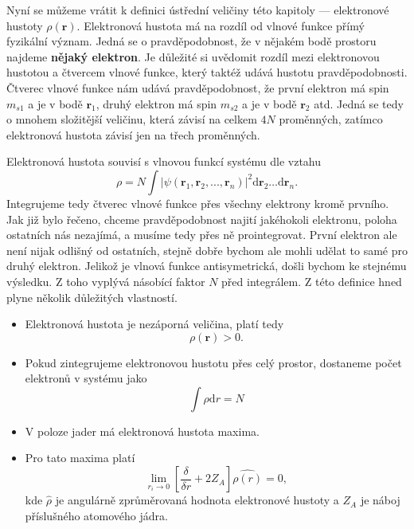 Nyní se můžeme vrátit k definici ústřední veličiny této kapitoly --- elektronové hustoty $\rho(\mathbf{r})$.
Elektronová hustota má na rozdíl od vlnové funkce přímý fyzikální význam. Jedná se o pravděpodobnost, že v nějakém bodě prostoru najdeme \textbf{nějaký elektron}. Je důležité si uvědomit rozdíl mezi elektronovou hustotou a čtvercem vlnové funkce, který taktéž udává hustotu pravděpodobnosti. Čtverec vlnové funkce nám udává pravděpodobnost, že první elektron má spin $m_{s1}$ a je v bodě $\mathbf{r}_1$, druhý elektron má spin $m_{s2}$ a je v bodě $\mathbf{r}_2$ atd. Jedná se tedy o mnohem složitější veličinu, která závisí na celkem $4N$ proměnných, zatímco elektronová hustota závisí jen na třech proměnných.

Elektronová hustota souvisí s vlnovou funkcí systému dle vztahu
\begin{equation}
\rho=N \int |\psi(\textbf{r}_1,\textbf{r}_2,...,\textbf{r}_n)|^2 \mathrm{d}\textbf{r}_2\dots\mathrm{d}\textbf{r}_n .
\label{rov:dft:defrho}
\end{equation}
Integrujeme tedy čtverec vlnové funkce přes všechny elektrony kromě prvního. Jak již bylo řečeno, chceme pravděpodobnost najití jakéhokoli elektronu, poloha ostatních nás nezajímá, a musíme tedy přes ně prointegrovat. První elektron ale není nijak odlišný od ostatních, stejně dobře bychom ale mohli udělat to samé pro druhý elektron. Jelikož je vlnová funkce antisymetrická, došli bychom ke stejnému výsledku. Z toho vyplývá násobící faktor $N$ před integrálem.
Z této definice hned plyne několik důležitých vlastností.

\begin{itemize}
\item Elektronová hustota je nezáporná veličina, platí tedy
\begin{equation}
\rho(\mathbf{r})  > 0 .
\end{equation}
\item Pokud zintegrujeme elektronovou hustotu přes celý prostor, dostaneme počet elektronů v systému jako
\begin{equation}
\int \rho\mathrm{d}r = N
\end{equation}

\item V poloze jader má elektronová hustota maxima.
\item Pro tato maxima platí
\begin{equation}
\lim_{r_i \to 0} \left[ \frac{\delta}{\delta r}+2Z_A\right]\hat{\rho(r)}=0, 
\end{equation}
kde $\hat{\rho}$ je angulárně zprůměrovaná hodnota elektronové hustoty a $Z_A$ je náboj příslušného atomového jádra.
\end{itemize}

